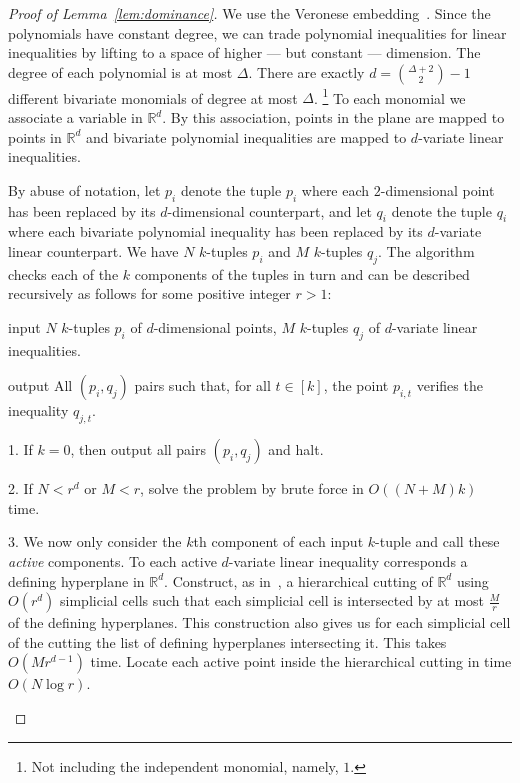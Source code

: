\begin{proof}[Proof of Lemma~\ref{lem:dominance}]
We use the Veronese embedding~\cite{Har77,Har13}.
Since the polynomials have constant degree, we can trade polynomial
inequalities for linear inequalities by lifting to a space of
higher --- but constant --- dimension. The degree of each polynomial is at most
$\Delta$. There are exactly $d = \binom{\Delta+2}{2} - 1$ different bivariate
monomials of degree at most $\Delta$.%
\footnote{Not including the independent monomial, namely, $1$.}
To each monomial we associate a variable
in $\mathbb{R}^d$. By this association, points in the plane are mapped to
points in $\mathbb{R}^d$ and bivariate polynomial inequalities are mapped to
$d$-variate linear inequalities.

By abuse of notation, let $p_i$ denote the tuple $p_i$ where each
$2$-dimensional point has been replaced by its $d$-dimensional counterpart, and
let $q_i$ denote the tuple $q_i$ where each bivariate polynomial inequality
has been replaced by its $d$-variate linear counterpart.
We have $N$ $k$-tuples $p_i$ and $M$ $k$-tuples $q_j$.
%
The algorithm checks each of the $k$ components of the tuples in turn and
can be described recursively as follows for some positive integer $r > 1$:
\begin{algorithm}\label{algo:pdr}
\item[input] $N$ $k$-tuples $p_i$ of $d$-dimensional points, $M$ $k$-tuples
	$q_j$ of $d$-variate linear inequalities.
\item[output] All $(p_i,q_j)$ pairs such that, for all $t \in [k]$, the point
	$p_{i,t}$ verifies the inequality $q_{j,t}$.
\item[1.] If $k=0$, then output all pairs $(p_i,q_j)$ and halt.
\item[2.] If $N < r^d$ or $M < r$, solve the problem by brute force
	in $O((N+M) k)$ time.
\item[3.]
We now only consider the $k$th component of each input $k$-tuple and call these
\emph{active} components.
%
To each active $d$-variate linear inequality corresponds a defining
hyperplane in $\mathbb{R}^d$.
Construct, as in~\cite{Ma93}, a hierarchical cutting of $\mathbb{R}^d$ using $O(r^d)$
simplicial cells such that each simplicial cell
is intersected by at most $\frac{M}{r}$ of the defining hyperplanes.
This construction also gives us for each simplicial cell of the cutting the list
of defining hyperplanes intersecting it.
This takes $O(Mr^{d-1})$ time.
%
Locate each active point inside the hierarchical cutting in time $O(N \log r)$.

\end{algorithm}
\end{proof}
